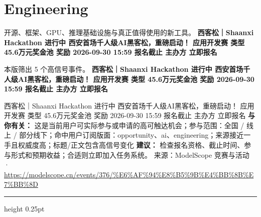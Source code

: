 \documentclass[10.5pt]{ctexart}
\begin{document}
\section*{Engineering}
{\color{ormuted} 开源、框架、GPU、推理基础设施与真正值得使用的新工具。}
\vspace{2mm}
{\LARGE\bfseries 西客松｜Shaanxi Hackathon 进行中 西安首场千人级AI黑客松，重磅启动！ 应用开发赛 类型 45.6万元奖金池 奖励 2026-09-30 15:59 报名截止 主办方 立即报名}\par
\vspace{1mm}
{\color{ormuted} 本版筛出 5 个高信号事件。}
\vspace{3mm}
{\Large\bfseries 西客松｜Shaanxi Hackathon 进行中 西安首场千人级AI黑客松，重磅启动！ 应用开发赛 类型 45.6万元奖金池 奖励 2026-09-30 15:59 报名截止 主办方 立即报名}\par
西客松｜Shaanxi Hackathon 进行中 西安首场千人级AI黑客松，重磅启动！ 应用开发赛 类型 45.6万元奖金池 奖励 2026-09-30 15:59 报名截止 主办方 立即报名
\textbf{与你有关：} 这是当前用户可实际参与或申请的高可触达机会；参与范围：全国 / 线上 / 部分线下；命中用户订阅版面：opportunity、ai、engineering；来源接近一手且权威度高；标题/正文包含高信号变化
\textbf{建议：} 检查报名资格、截止时间、参与形式和预期收益；合适则立即加入任务系统。
{\footnotesize\color{ormuted} 来源：ModelScope 竞赛与活动 · \url{https://modelscope.cn/events/376/%E6%AF%94%E8%B5%9B%E4%BB%8B%E7%BB%8D}}
\vspace{4mm}
\hrule height 0.25pt
\vspace{3mm}
\end{document}
